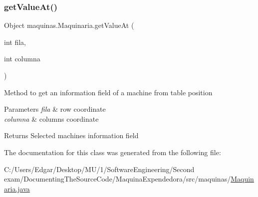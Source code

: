 \subsubsection{\texorpdfstring{get\+Value\+At()}{getValueAt()}}
{\footnotesize\ttfamily Object maquinas.\+Maquinaria.\+get\+Value\+At (\begin{DoxyParamCaption}\item[{int}]{fila,  }\item[{int}]{columna }\end{DoxyParamCaption})\hspace{0.3cm}{\ttfamily [inline]}}

Method to get an information field of a machine from table position 
\begin{DoxyParams}{Parameters}
{\em fila} & row coordinate \\
\hline
{\em columna} & columns coordinate \\
\hline
\end{DoxyParams}
\begin{DoxyReturn}{Returns}
Selected machine\textquotesingle{}s information field 
\end{DoxyReturn}


The documentation for this class was generated from the following file\+:\begin{DoxyCompactItemize}
\item 
C\+:/\+Users/\+Edgar/\+Desktop/\+M\+U/1/\+Software\+Engineering/\+Second exam/\+Documenting\+The\+Source\+Code/\+Maquina\+Expendedora/src/maquinas/\mbox{\hyperlink{_maquinaria_8java}{Maquinaria.\+java}}\end{DoxyCompactItemize}
